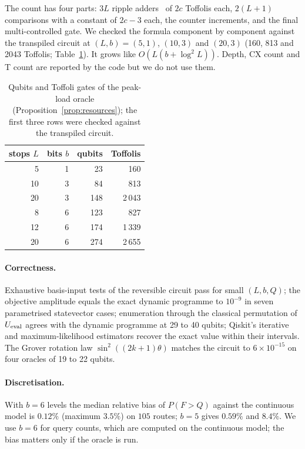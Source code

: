 \documentclass[pdflatex,sn-mathphys-num]{sn-jnl}
\theoremstyle{thmstyleone}
\theoremstyle{thmstyletwo}
\begin{document}
The count has four parts: $3L$ ripple adders~\cite{Cuccaro2004} of $2c$ Toffolis each, $2(L+1)$ comparisons with a constant of $2c-3$ each, the counter increments, and the final multi-controlled gate. We checked the formula component by component against the transpiled circuit at $(L,b)=(5,1)$, $(10,3)$ and $(20,3)$ (160, 813 and 2043 Toffolis; Table~\ref{tab:resources}). It grows like $O(L(b+\log^2L))$. Depth, CX count and T count are reported by the code but we do not use them.

\begin{table}[t]
\caption{Qubits and Toffoli gates of the peak-load oracle (Proposition~\ref{prop:resources}); the first three rows were checked against the transpiled circuit.}\label{tab:resources}
\begin{tabular}{@{}rrrr@{}}
\toprule
stops $L$ & bits $b$ & qubits & Toffolis \\
\midrule
5 & 1 & 23 & 160 \\
10 & 3 & 84 & 813 \\
20 & 3 & 148 & 2\,043 \\
8 & 6 & 123 & 827 \\
12 & 6 & 174 & 1\,339 \\
20 & 6 & 274 & 2\,655 \\
\bottomrule
\end{tabular}
\end{table}

\paragraph{Correctness.} Exhaustive basis-input tests of the reversible circuit pass for small $(L,b,Q)$; the objective amplitude equals the exact dynamic programme to $10^{-9}$ in seven parametrised statevector cases; enumeration through the classical permutation of $U_{\rm eval}$ agrees with the dynamic programme at 29 to 40 qubits; Qiskit's iterative and maximum-likelihood estimators recover the exact value within their intervals. The Grover rotation law $\sin^2((2k+1)\theta)$ matches the circuit to $6\times10^{-15}$ on four oracles of 19 to 22 qubits.

\paragraph{Discretisation.} With $b=6$ levels the median relative bias of $P(F>Q)$ against the continuous model is $0.12\%$ (maximum $3.5\%$) on $105$ routes; $b=5$ gives $0.59\%$ and $8.4\%$. We use $b=6$ for query counts, which are computed on the continuous model; the bias matters only if the oracle is run.
\end{document}
